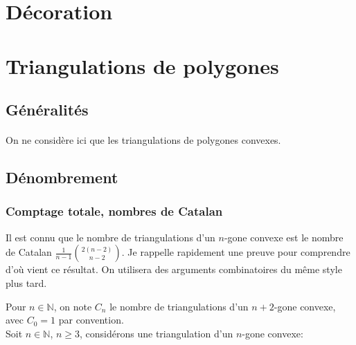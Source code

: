 \documentclass[10pt,a4paper]{article}
\begin{document}
		
	\section{Décoration}
	
	
	
\section{Triangulations de polygones}


	\subsection{Généralités}
		\paragraph{}On ne considère ici que les triangulations de polygones convexes.
		
		
	\subsection{Dénombrement}
	
		\subsubsection{Comptage totale, nombres de Catalan}
			Il est connu que le nombre de triangulations d'un $n$-gone convexe est le nombre de Catalan 
			$\frac{1}{n-1}\binom{2(n-2)}{n-2}$. Je rappelle rapidement une preuve pour comprendre d'où vient ce résultat. On utilisera des arguments combinatoires du même style plus tard.

			Pour $n\in\mathbb{N}$, on note $C_{n}$ le nombre de triangulations d'un $n+2$-gone convexe, avec $C_{0} = 1$ par convention.\\			
			Soit $n \in \mathbb{N}$, $n \geqslant3$, considérons une triangulation  d'un $n$-gone convexe:\\
\end{document}
